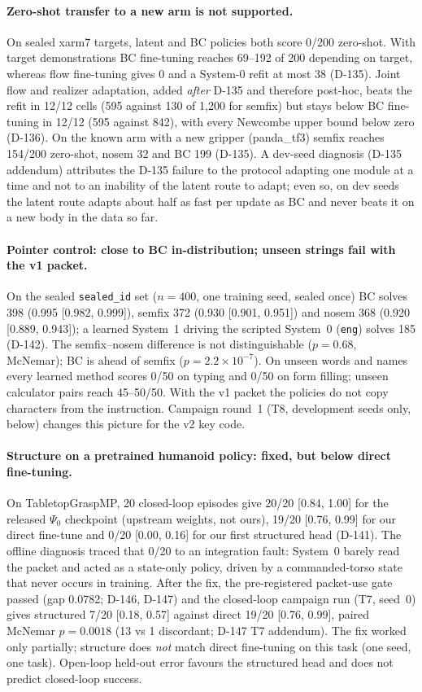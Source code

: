 \documentclass[10pt,twocolumn]{article}
\begin{document}
\paragraph{Zero-shot transfer to a new arm is not supported.} On sealed xarm7 targets, latent and BC policies both score 0/200 zero-shot. With target demonstrations BC fine-tuning reaches 69--192 of 200 depending on target, whereas flow fine-tuning gives 0 and a System-0 refit at most 38 (D-135). Joint flow and realizer adaptation, added \emph{after} D-135 and therefore post-hoc, beats the refit in 12/12 cells (595 against 130 of 1{,}200 for semfix) but stays below BC fine-tuning in 12/12 (595 against 842), with every Newcombe upper bound below zero (D-136). On the known arm with a new gripper (panda\_tf3) semfix reaches 154/200 zero-shot, nosem 32 and BC 199 (D-135). A dev-seed diagnosis (D-135 addendum) attributes the D-135 failure to the protocol adapting one module at a time and not to an inability of the latent route to adapt; even so, on dev seeds the latent route adapts about half as fast per update as BC and never beats it on a new body in the data so far.

\paragraph{Pointer control: close to BC in-distribution; unseen strings fail with the v1 packet.} On the sealed \texttt{sealed\_id} set ($n{=}400$, one training seed, sealed once) BC solves 398 (0.995 [0.982, 0.999]), semfix 372 (0.930 [0.901, 0.951]) and nosem 368 (0.920 [0.889, 0.943]); a learned System~1 driving the scripted System~0 (\texttt{eng}) solves 185 (D-142). The semfix--nosem difference is not distinguishable ($p{=}0.68$, McNemar); BC is ahead of semfix ($p{=}2.2\times10^{-7}$). On unseen words and names every learned method scores 0/50 on typing and 0/50 on form filling; unseen calculator pairs reach 45--50/50. With the v1 packet the policies do not copy characters from the instruction. Campaign round~1 (T8, development seeds only, below) changes this picture for the v2 key code.

\paragraph{Structure on a pretrained humanoid policy: fixed, but below direct fine-tuning.} On TabletopGraspMP, 20 closed-loop episodes give 20/20 [0.84, 1.00] for the released $\Psi_0$ checkpoint (upstream weights, not ours), 19/20 [0.76, 0.99] for our direct fine-tune and 0/20 [0.00, 0.16] for our first structured head (D-141). The offline diagnosis traced that 0/20 to an integration fault: System~0 barely read the packet and acted as a state-only policy, driven by a commanded-torso state that never occurs in training. After the fix, the pre-registered packet-use gate passed (gap 0.0782; D-146, D-147) and the closed-loop campaign run (T7, seed~0) gives structured 7/20 [0.18, 0.57] against direct 19/20 [0.76, 0.99], paired McNemar $p{=}0.0018$ (13 vs 1 discordant; D-147 T7 addendum). The fix worked only partially; structure does \emph{not} match direct fine-tuning on this task (one seed, one task). Open-loop held-out error favours the structured head and does not predict closed-loop success.
\end{document}
